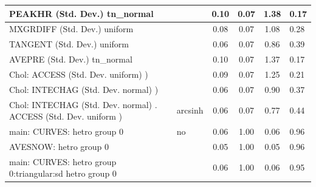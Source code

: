\begin{table}
\begin{center}
\begin{tabular}{|l|l|c|c|c|l|}
			\hline
			PEAKHR (Std. Dev.) tn_normal &  & 0.10 & 0.07 & 1.38 & 0.17 \\
			\hline
			MXGRDIFF (Std. Dev.) uniform &  & 0.08 & 0.07 & 1.08 & 0.28 \\
			\hline
			TANGENT (Std. Dev.) uniform &  & 0.06 & 0.07 & 0.86 & 0.39 \\
			\hline
			AVEPRE (Std. Dev.) tn_normal &  & 0.10 & 0.07 & 1.37 & 0.17 \\
			\hline
			 Chol: ACCESS (Std. Dev. uniform) ) &  & 0.09 & 0.07 & 1.25 & 0.21 \\
			\hline
			 Chol: INTECHAG (Std. Dev. normal) ) &  & 0.06 & 0.07 & 0.90 & 0.37 \\
			\hline
			 Chol: INTECHAG (Std. Dev. normal) . ACCESS (Std. Dev.   uniform ) & arcsinh & 0.06 & 0.07 & 0.77 & 0.44 \\
			\hline
			main: CURVES: hetro group 0 & no & 0.06 & 1.00 & 0.06 & 0.96 \\
			\hline
			AVESNOW: hetro group 0 &  & 0.05 & 1.00 & 0.05 & 0.96 \\
			\hline
			main: CURVES: hetro group 0:triangular:sd  hetro group 0 &  & 0.06 & 1.00 & 0.06 & 0.95 \\
			\hline
		\end{tabular}
	\end{center}
\end{table}